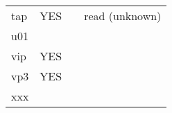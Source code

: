 \begin{longtable}[]{@{}llll@{}}
\begin{minipage}[t]{0.19\columnwidth}
tap\strut
\end{minipage} & \begin{minipage}[t]{0.22\columnwidth}\raggedright
YES\strut
\end{minipage} & \begin{minipage}[t]{0.25\columnwidth}\raggedright
\strut
\end{minipage} & \begin{minipage}[t]{0.22\columnwidth}\raggedright
read (unknown)\strut
\end{minipage}\tabularnewline
\begin{minipage}[t]{0.19\columnwidth}\raggedright
u01\strut
\end{minipage} & \begin{minipage}[t]{0.22\columnwidth}\raggedright
\strut
\end{minipage} & \begin{minipage}[t]{0.25\columnwidth}\raggedright
\strut
\end{minipage} & \begin{minipage}[t]{0.22\columnwidth}\raggedright
\strut
\end{minipage}\tabularnewline
\begin{minipage}[t]{0.19\columnwidth}\raggedright
vip\strut
\end{minipage} & \begin{minipage}[t]{0.22\columnwidth}\raggedright
YES\strut
\end{minipage} & \begin{minipage}[t]{0.25\columnwidth}\raggedright
\strut
\end{minipage} & \begin{minipage}[t]{0.22\columnwidth}\raggedright
\strut
\end{minipage}\tabularnewline
\begin{minipage}[t]{0.19\columnwidth}\raggedright
vp3\strut
\end{minipage} & \begin{minipage}[t]{0.22\columnwidth}\raggedright
YES\strut
\end{minipage} & \begin{minipage}[t]{0.25\columnwidth}\raggedright
\strut
\end{minipage} & \begin{minipage}[t]{0.22\columnwidth}\raggedright
\strut
\end{minipage}\tabularnewline
\begin{minipage}[t]{0.19\columnwidth}\raggedright
xxx\strut
\end{minipage} & \begin{minipage}[t]{0.22\columnwidth}\raggedright

\end{minipage}
\end{longtable}
